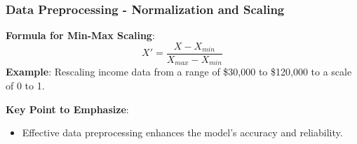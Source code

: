 \documentclass[aspectratio=169]{beamer}
\begin{document}
\begin{frame}[fragile]
    \frametitle{Data Preprocessing - Normalization and Scaling}
    \textbf{Formula for Min-Max Scaling}:
    \begin{equation}
    X' = \frac{X - X_{min}}{X_{max} - X_{min}}
    \end{equation}
    \textbf{Example}: Rescaling income data from a range of \$30,000 to \$120,000 to a scale of 0 to 1.

    \vspace{1em}
    \textbf{Key Point to Emphasize}:
    \begin{itemize}
        \item Effective data preprocessing enhances the model's accuracy and reliability.
    \end{itemize}
\end{frame}
\end{document}
